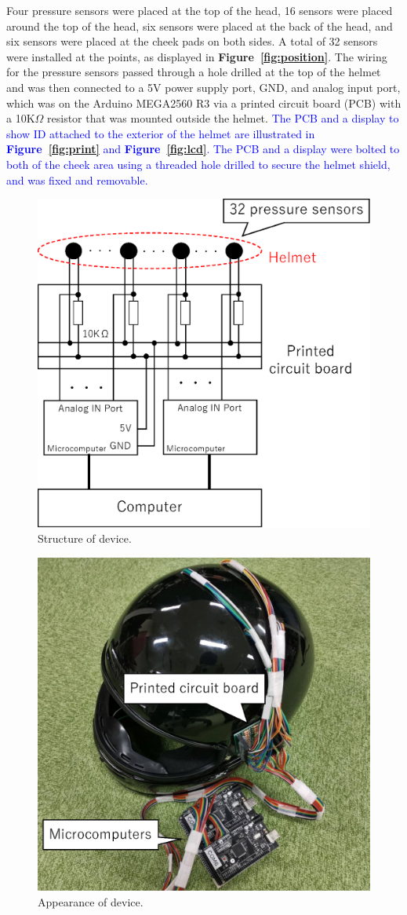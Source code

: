 \documentclass[sigchi,authordraft]{acmart}
\newcommand\figref[1]{\textbf{Figure~\ref{fig:#1}}}
\begin{document}
Four pressure sensors were placed at the top of the head, 16 sensors were placed around the top of the head, six sensors were placed at the back of the head, and six sensors were placed at the cheek pads on both sides. A total of 32 sensors were installed at the points, as displayed in \figref{position}. The wiring for the pressure sensors passed through a hole drilled at the top of the helmet and was then connected to a 5V power supply port, GND, and analog input port, which was on the Arduino MEGA2560 R3 via a printed circuit board (PCB) with a 10K$\Omega$ resistor that was mounted outside the helmet. \textcolor{blue}{The PCB and a display to show ID attached to the exterior of the helmet are illustrated in \figref{print} and \figref{lcd}. The PCB and a display were bolted to both of the cheek area using a threaded hole drilled to secure the helmet shield, and was fixed and removable.}

\begin{figure}[!t]
  \begin{center}
    \includegraphics[width=0.5\linewidth]{figure/device.eps}
  \end{center}
  \caption{Structure of device.}
  \label{fig:device}
\end{figure}

\begin{figure}[!t]
  \begin{center}
    \includegraphics[width=0.4\linewidth]{figure/met_over.eps}
  \end{center}
  \caption{Appearance of device.}
  \label{fig:met_over}
\end{figure}
\end{document}

